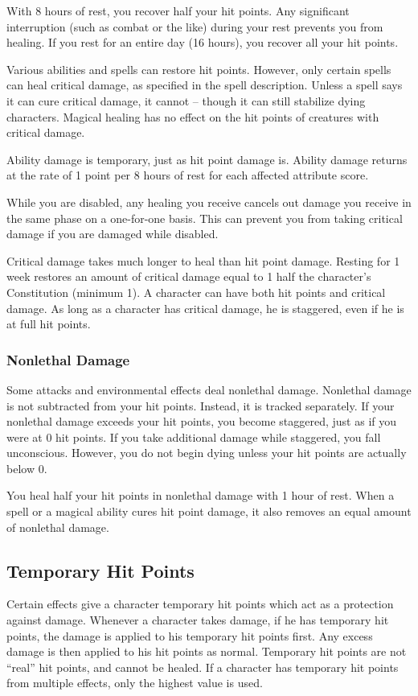  With 8 hours of rest, you recover half your hit points.
Any significant interruption (such as combat or the like) during your rest prevents you from healing.
If you rest for an entire day (16 hours), you recover all your hit points.

 Various abilities and spells can restore hit points.
However, only certain spells can heal critical damage, as specified in the spell description.
Unless a spell says it can cure critical damage, it cannot -- though it can still stabilize dying characters.
Magical healing has no effect on the hit points of creatures with critical damage.

 Ability damage is temporary, just as hit point damage is.
Ability damage returns at the rate of 1 point per 8 hours of rest for each affected attribute score.

 While you are disabled, any healing you receive cancels out damage you receive in the same phase on a one-for-one basis.
This can prevent you from taking critical damage if you are damaged while disabled.

 Critical damage takes much longer to heal than hit point damage.
Resting for 1 week restores an amount of critical damage equal to 1 \add half the character's Constitution (minimum 1).
A character can have both hit points and critical damage.
As long as a character has critical damage, he is staggered, even if he is at full hit points.

\subsubsection{Nonlethal Damage}\label{Nonlethal Damage}
Some attacks and environmental effects deal nonlethal damage.
Nonlethal damage is not subtracted from your hit points.
Instead, it is tracked separately.
If your nonlethal damage exceeds your hit points, you become staggered, just as if you were at 0 hit points.
If you take additional damage while staggered, you fall unconscious.
However, you do not begin dying unless your hit points are actually below 0.

You heal half your hit points in nonlethal damage with 1 hour of rest.
When a spell or a magical ability cures hit point damage, it also removes an equal amount of nonlethal damage.

\subsection{Temporary Hit Points}\label{Temporary Hit Points}
Certain effects give a character temporary hit points which act as a protection against damage.
Whenever a character takes damage, if he has temporary hit points, the damage is applied to his temporary hit points first.
Any excess damage is then applied to his hit points as normal.
Temporary hit points are not ``real'' hit points, and cannot be healed.
If a character has temporary hit points from multiple effects, only the highest value is used.

